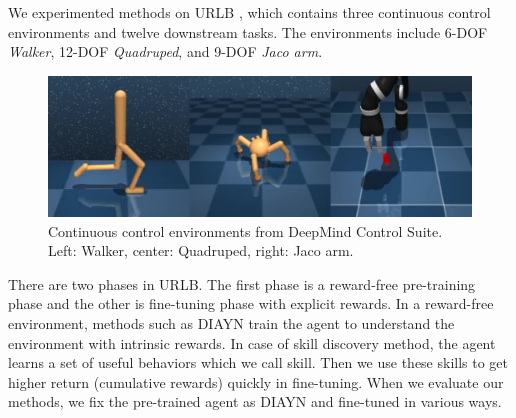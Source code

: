 We experimented methods on URLB \cite{laskin2021urlb}, which contains three continuous control environments and twelve downstream tasks.
The environments include 6-DOF \emph{Walker}, 12-DOF \emph{Quadruped}, and 9-DOF \emph{Jaco arm}. 

\begin{figure}[ht]
    \vskip 0.2in
    \begin{center}
    \centerline{\includegraphics[width=\columnwidth]{Figures/figure_env.jpg}}
    \caption{Continuous control environments from DeepMind Control Suite. Left: Walker, center: Quadruped, right: Jaco arm.}
    \label{fig:environments}
    \end{center}
    \vskip -0.2in
\end{figure}


There are two phases in URLB.
The first phase is a reward-free pre-training phase and the other is fine-tuning phase with explicit rewards.
In a reward-free environment, methods such as DIAYN train the agent to understand the environment with intrinsic rewards.
In case of skill discovery method, the agent learns a set of useful behaviors which we call skill.
Then we use these skills to get higher return (cumulative rewards) quickly in fine-tuning.
When we evaluate our methods, we fix the pre-trained agent as DIAYN and fine-tuned in various ways.


